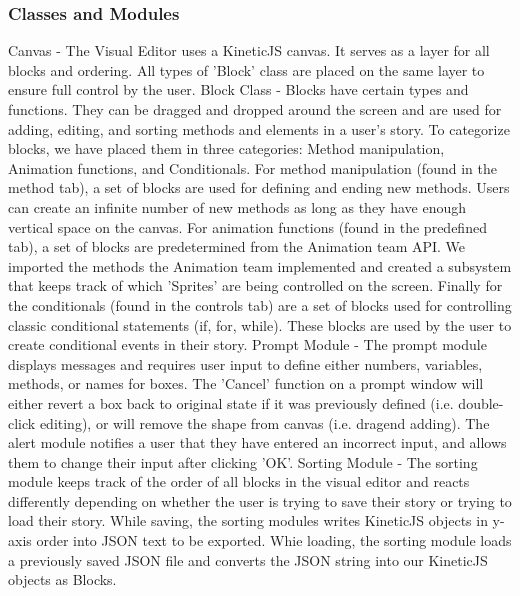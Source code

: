 \documentclass[a4paper]{article}
\begin{document}
\subsubsection{Classes and Modules}
Canvas - The Visual Editor uses a KineticJS canvas. It serves as a layer for all blocks and ordering. All types of 'Block' class are placed on the same layer to ensure full control by the user. \newline \newline
Block Class - Blocks have certain types and functions. They can be dragged and dropped around the screen and are used for adding, editing, and sorting methods and elements in a user's story. To categorize blocks, we have placed them in three categories: Method manipulation, Animation functions, and Conditionals. For method manipulation (found in the method tab), a set of blocks are used for defining and ending new methods. Users can create an infinite number of new methods as long as they have enough vertical space on the canvas. For animation functions (found in the predefined tab), a set of blocks are predetermined from the Animation team API. We imported the methods the Animation team implemented and created a subsystem that keeps track of which 'Sprites' are being controlled on the screen. Finally for the conditionals (found in the controls tab) are a set of blocks used for controlling classic conditional statements (if, for, while). These blocks are used by the user to create conditional events in their story.\newline \newline
Prompt Module - The prompt module displays messages and requires user input to define either numbers, variables, methods, or names for boxes. The 'Cancel' function on a prompt window will either revert a box back to original state if it was previously defined (i.e. double-click editing), or will remove the shape from canvas (i.e. dragend adding). The alert module notifies a user that they have entered an incorrect input, and allows them to change their input after clicking 'OK'. \newline \newline
Sorting Module - The sorting module keeps track of the order of all blocks in the visual editor and reacts differently depending on whether the user is trying to save their story or trying to load their story. While saving, the sorting modules writes KineticJS objects in y-axis order into JSON text to be exported. Whie loading, the sorting module loads a previously saved JSON file and converts the JSON string into our KineticJS objects as Blocks.
\end{document}

